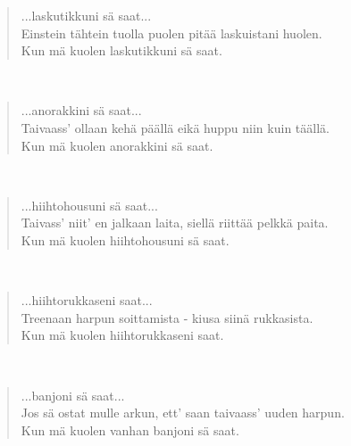 \noindent\begin{minipage}{\linewidth}
\begin{verse}
	...laskutikkuni sä saat...\\
	Einstein tähtein tuolla puolen pitää laskuistani huolen.\\
	Kun mä kuolen laskutikkuni sä saat.\\
\end{verse}
\end{minipage}\\[10pt]
\noindent\begin{minipage}{\linewidth}
\begin{verse}
	...anorakkini sä saat...\\
	Taivaass' ollaan kehä päällä eikä huppu niin kuin täällä.\\
	Kun mä kuolen anorakkini sä saat.\\
\end{verse}
\end{minipage}\\[10pt]
\noindent\begin{minipage}{\linewidth}
\begin{verse}
	...hiihtohousuni sä saat...\\
	Taivass' niit' en jalkaan laita, siellä riittää pelkkä paita.\\
	Kun mä kuolen hiihtohousuni sä saat.\\
\end{verse}
\end{minipage}\\[10pt]
\noindent\begin{minipage}{\linewidth}
\begin{verse}
	...hiihtorukkaseni saat...\\
	Treenaan harpun soittamista - kiusa siinä rukkasista.\\
	Kun mä kuolen hiihtorukkaseni saat.\\
\end{verse}
\end{minipage}\\[10pt]
\noindent\begin{minipage}{\linewidth}
\begin{verse}
	...banjoni sä saat...\\
	Jos sä ostat mulle arkun, ett' saan taivaass' uuden harpun.\\
	Kun mä kuolen vanhan banjoni sä saat.\\
\end{verse}
\end{minipage}\\[10pt]

